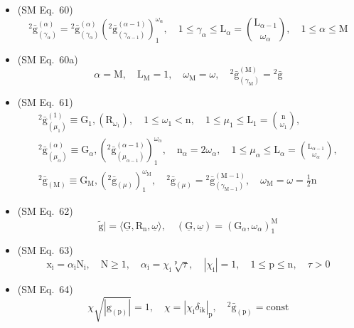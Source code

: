 \documentclass[
    12pt,              %
    a4paper,           %
    headings=normal,   %
    twoside=true,      %
    BCOR=8mm,          %
]{scrbook}
\begin{document}
\begin{itemize}[label={},leftmargin=0pt]
    \item (SM Eq.\ 60) 
    \[
    {}^2\bar{\mathrm{g}}_{(\gamma_\alpha)}^{(\alpha)} = {}^2\bar{\mathrm{g}}_{(\gamma_\alpha)}^{(\alpha)} \left( {}^2\bar{\mathrm{g}}_{(\gamma_{\alpha-1})}^{(\alpha-1)} \right)_1^{\omega_\alpha}, \quad 1 \le \gamma_\alpha \le \mathrm{L}_\alpha = \binom{\mathrm{L}_{\alpha-1}}{\omega_\alpha}, \quad 1 \le \alpha \le \mathrm{M}
    \]

    \item (SM Eq.\ 60a) 
    \[
    \alpha = \mathrm{M}, \quad \mathrm{L}_{\mathrm{M}} = 1, \quad \omega_{\mathrm{M}} = \omega, \quad {}^2\bar{\mathrm{g}}_{(\gamma_{\mathrm{M}})}^{(\mathrm{M})} = {}^2\bar{\mathrm{g}}
    \]

    \item (SM Eq.\ 61) 
    \[
    \begin{gathered}
    {}^2\bar{\mathrm{g}}_{(\mu_1)}^{(1)} \equiv \mathrm{G}_1, \left(\mathrm{R}_{\omega_1}\right), \quad 1 \le \omega_1 < \mathrm{n}, \quad 1 \le \mu_1 \le \mathrm{L}_1 = \binom{\mathrm{n}}{\omega_1}, \\
    {}^2\bar{\mathrm{g}}_{(\mu_\alpha)}^{(\alpha)} \equiv \mathrm{G}_\alpha, \left( {}^2\bar{\mathrm{g}}_{(\mu_{\alpha-1})}^{(\alpha-1)} \right)_1^{\omega_\alpha}, \quad \mathrm{n}_\alpha = 2\omega_\alpha, \quad 1 \le \mu_\alpha \le \mathrm{L}_\alpha = \binom{\mathrm{L}_{\alpha-1}}{\omega_\alpha}, \\
    {}^2\bar{\mathrm{g}}_{(\mathrm{M})} \equiv \mathrm{G}_{\mathrm{M}}, \left( {}^2\bar{\mathrm{g}}_{(\mu)} \right)_1^{\omega_{\mathrm{M}}}, \quad {}^2\bar{\mathrm{g}}_{(\mu)} = {}^2\bar{\mathrm{g}}_{(\gamma_{\mathrm{M}-1})}^{(\mathrm{M}-1)}, \quad \omega_{\mathrm{M}} = \omega = \frac{1}{2}\mathrm{n}
    \end{gathered}
    \]

    \item (SM Eq.\ 62) 
    \[
    \tilde{\mathrm{g}}| = \langle \underline{\mathrm{G}}, \mathrm{R}_{\mathrm{n}}, \underline{\omega} \rangle, \quad (\underline{\mathrm{G}}, \underline{\omega}) = \left(\mathrm{G}_\alpha, \omega_\alpha\right)_1^{\mathrm{M}}
    \]

    \item (SM Eq.\ 63) 
    \[
    \mathrm{x_i} = \alpha_\mathrm{i} \mathrm{N_i}, \quad \mathrm{N} \ge 1, \quad \alpha_\mathrm{i} = \chi_\mathrm{i} \sqrt[\mathrm{p}]{\tau}, \quad |\chi_\mathrm{i}| = 1, \quad 1 \le \mathrm{p} \le \mathrm{n}, \quad \tau > 0
    \]

    \item (SM Eq.\ 64) 
    \[
    \chi \sqrt{|\mathrm{g}_{(\mathrm{p})}|} = 1, \quad \chi = |\chi_\mathrm{i} \delta_{\mathrm{ik}}|_\mathrm{p}, \quad {}^2\bar{\mathrm{g}}_{(\mathrm{p})} = \mathrm{const}
    \]


\end{itemize}
\end{document}

